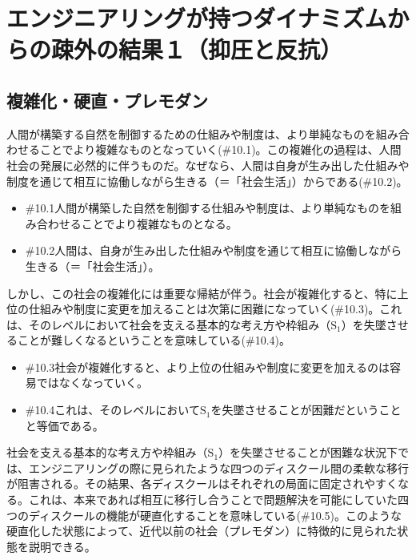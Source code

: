 \section{エンジニアリングが持つダイナミズムからの疎外の結果１（抑圧と反抗）}\label{ux30a8ux30f3ux30b8ux30cbux30a2ux30eaux30f3ux30b0ux304cux6301ux3064ux30c0ux30a4ux30caux30dfux30baux30e0ux304bux3089ux306eux758eux5916ux306eux7d50ux679cuxff11ux6291ux5727ux3068ux53cdux6297}

\subsection{複雑化・硬直・プレモダン}\label{ux8907ux96d1ux5316ux786cux76f4ux30d7ux30ecux30e2ux30c0ux30f3}

人間が構築する自然を制御するための仕組みや制度は、より単純なものを組み合わせることでより複雑なものとなっていく(\#10.1)。この複雑化の過程は、人間社会の発展に必然的に伴うものだ。なぜなら、人間は自身が生み出した仕組みや制度を通じて相互に協働しながら生きる（＝「社会生活」）からである(\#10.2)。

\begin{note}{}
  \begin{itemize}
    \tightlist
    \item{\#10.1}人間が構築した自然を制御する仕組みや制度は、より単純なものを組み合わせることでより複雑なものとなる。
    \item{\#10.2}人間は、自身が生み出した仕組みや制度を通じて相互に協働しながら生きる（＝「社会生活」）。
  \end{itemize}
\end{note}

しかし、この社会の複雑化には重要な帰結が伴う。社会が複雑化すると、特に上位の仕組みや制度に変更を加えることは次第に困難になっていく(\#10.3)。これは、そのレベルにおいて社会を支える基本的な考え方や枠組み（\(\textrm{S}_1\)）を失墜させることが難しくなるということを意味している(\#10.4)。

\begin{note}{}
  \begin{itemize}
    \tightlist
    \item{\#10.3}社会が複雑化すると、より上位の仕組みや制度に変更を加えるのは容易ではなくなっていく。
    \item{\#10.4}これは、そのレベルにおいて$\textrm{S}_1$を失墜させることが困難だということと等価である。
  \end{itemize}
\end{note}

社会を支える基本的な考え方や枠組み（\(\textrm{S}_1\)）を失墜させることが困難な状況下では、エンジニアリングの際に見られたような四つのディスクール間の柔軟な移行が阻害される。その結果、各ディスクールはそれぞれの局面に固定されやすくなる。これは、本来であれば相互に移行し合うことで問題解決を可能にしていた四つのディスクールの機能が硬直化することを意味している(\#10.5)。このような硬直化した状態によって、近代以前の社会（プレモダン）に特徴的に見られた状態を説明できる。

